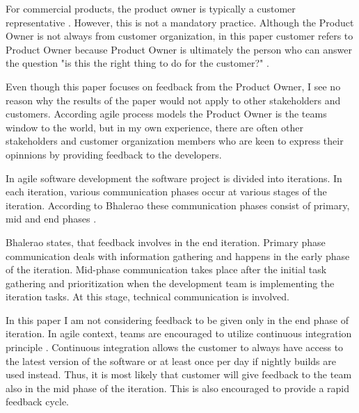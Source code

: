 \documentclass[conference]{IEEEtran}
\begin{document}
For commercial products, the product owner is typically a customer representative \cite{2010pichler}. However, this is not a mandatory practice. Although the Product Owner is not always from customer organization, in this paper customer refers to Product Owner because Product Owner is ultimately the person who can answer the question "is this the right thing to do for the customer?" \cite{2012sutherland}. 

Even though this paper focuses on feedback from the Product Owner, I see no reason why the results of the paper would not apply to other stakeholders and customers. According agile process models the Product Owner is the teams window to the world, but in my own experience, there are often other stakeholders and customer organization members who are keen to express their opinnions by providing feedback to the developers.

\begin{comment}

- Asiakas TAI henkilö, jolla on kyky olla asiakkaan edustajana
- Ikkuna ulkomaailmaan
- Proxy asiakkaan suuntaan
- Käsitelläänkö tässä molempia? Palautetta Product ownerilta JA palautetta asiakkaalta

\end{comment}

In agile software development the software project is divided into iterations. In each iteration, various communication phases occur at various stages of the iteration. According to Bhalerao these communication phases consist of primary, mid and end phases \cite{2010bhalerao}.

Bhalerao states, that feedback involves in the end iteration. Primary phase communication deals with information gathering and happens in the early phase of the iteration. Mid-phase communication takes place after the initial task gathering and prioritization when the development team is implementing the iteration tasks. At this stage, technical communication is involved. \cite{2010bhalerao}

In this paper I am not considering feedback to be given only in the end phase of iteration. In agile context, teams are encouraged to utilize continuous integration principle \cite{2002wake}. Continuous integration allows the customer to always have access to the latest version of the software or at least once per day if nightly builds are used instead. Thus, it is most likely that customer will give feedback to the team also in the mid phase of the iteration. This is also encouraged to provide a rapid feedback cycle.
\end{document}
